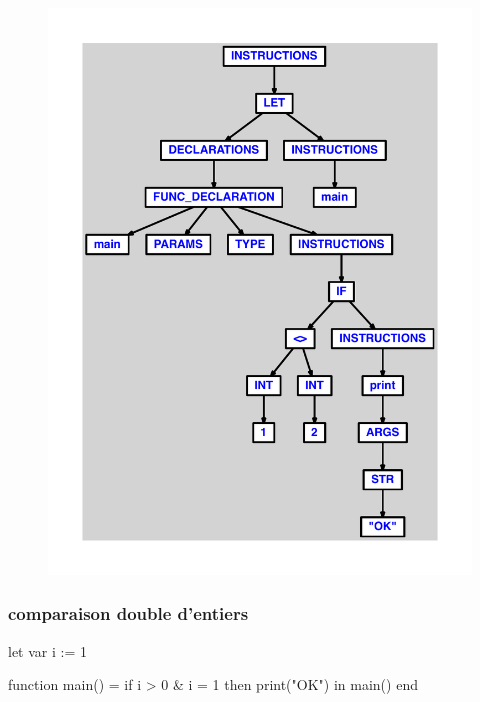 \documentclass{article}
\begin{document}
\begin{figure}[H]\centering\includegraphics[max width=\textwidth]{ast/ast_172.pdf}\end{figure}\subsubsection{comparaison double d'entiers}
\begin{verbatimtab}
let
	var i := 1

	function main() =
		if i > 0 & i = 1 then print("OK")
in main() end
\end{verbatimtab}
\end{document}
